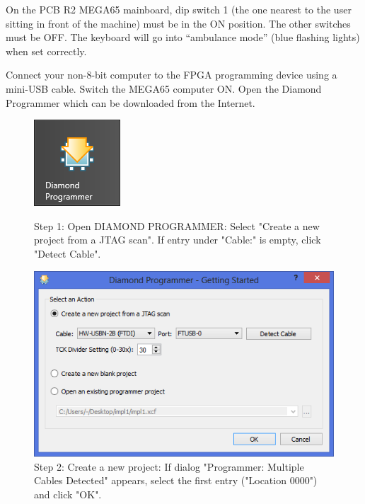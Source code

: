 On the PCB R2 MEGA65 mainboard, dip switch 1 (the one nearest to the user
sitting in front of the machine) must be in the ON position. The other
switches must be OFF. The keyboard will go into ``ambulance mode''
(blue flashing lights) when set correctly.

Connect your non-8-bit computer to the FPGA programming device using a
mini-USB cable. Switch the MEGA65 computer ON. Open the Diamond Programmer
which can be downloaded from the Internet.

\begin{figure}[H]
  \centering
  \includegraphics{images/diamond01.png}
  \captionsetup{width=0.8\linewidth}
  \caption{Step 1: Open DIAMOND PROGRAMMER:
           Select "Create a new project from a JTAG scan". If entry
           under "Cable:" is empty, click "Detect Cable".}
  \label{fig:diamond01}

\vspace{5mm}

  \includegraphics[width=0.8\linewidth]{images/diamond02.png}
  \captionsetup{width=0.8\linewidth}
  \caption{Step 2: Create a new project:
           If dialog "Programmer: Multiple Cables Detected" appears,
           select the first entry ("Location 0000") and click "OK".}
  \label{fig:diamond02}
\end{figure}


